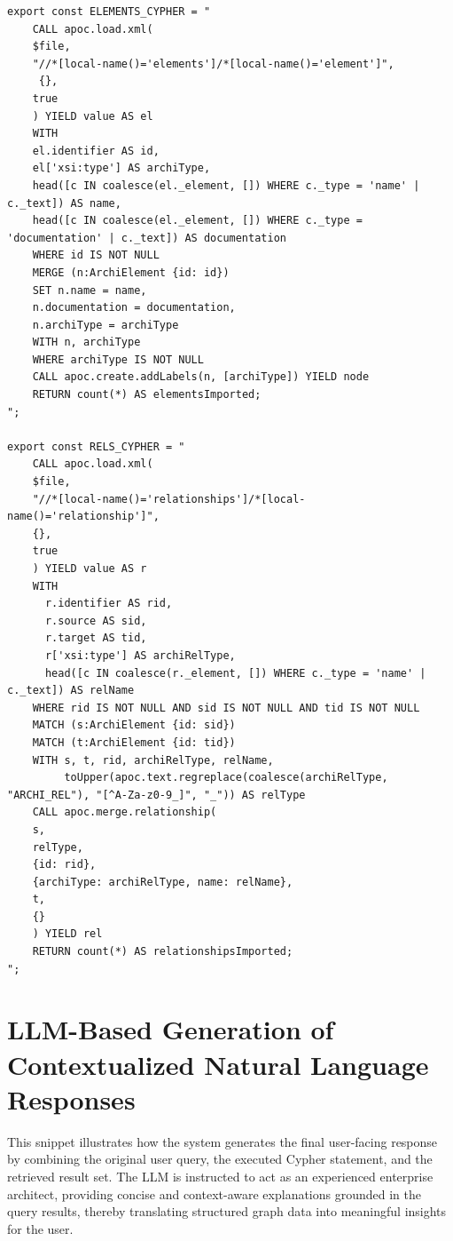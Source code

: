 \begin{lstlisting}[style=javascriptstyle, label={lst:system_prompt_1}]
export const ELEMENTS_CYPHER = "
	CALL apoc.load.xml(
	$file,
	"//*[local-name()='elements']/*[local-name()='element']",
	 {},
	true
	) YIELD value AS el
	WITH
	el.identifier AS id,
	el['xsi:type'] AS archiType,
	head([c IN coalesce(el._element, []) WHERE c._type = 'name' | c._text]) AS name,
	head([c IN coalesce(el._element, []) WHERE c._type = 'documentation' | c._text]) AS documentation
	WHERE id IS NOT NULL
	MERGE (n:ArchiElement {id: id})
	SET n.name = name,
    n.documentation = documentation,
    n.archiType = archiType
	WITH n, archiType
	WHERE archiType IS NOT NULL
	CALL apoc.create.addLabels(n, [archiType]) YIELD node
	RETURN count(*) AS elementsImported;
";

export const RELS_CYPHER = "
	CALL apoc.load.xml(
  	$file,
  	"//*[local-name()='relationships']/*[local-name()='relationship']",
  	{},
  	true
	) YIELD value AS r	
	WITH
	  r.identifier AS rid,
	  r.source AS sid,
	  r.target AS tid,
	  r['xsi:type'] AS archiRelType,
	  head([c IN coalesce(r._element, []) WHERE c._type = 'name' | c._text]) AS relName
	WHERE rid IS NOT NULL AND sid IS NOT NULL AND tid IS NOT NULL
	MATCH (s:ArchiElement {id: sid})
	MATCH (t:ArchiElement {id: tid})
	WITH s, t, rid, archiRelType, relName,
    	 toUpper(apoc.text.regreplace(coalesce(archiRelType, "ARCHI_REL"), "[^A-Za-z0-9_]", "_")) AS relType
	CALL apoc.merge.relationship(
  	s,
  	relType,
  	{id: rid},
  	{archiType: archiRelType, name: relName},
  	t,
 	{}
	) YIELD rel
	RETURN count(*) AS relationshipsImported;
";
\end{lstlisting}


\section{LLM-Based Generation of Contextualized Natural Language Responses}
\label{appendix:code:nlresponse}
This snippet illustrates how the system generates the final user-facing response by combining the original user query, the executed Cypher statement, and the retrieved result set. The LLM is instructed to act as an experienced enterprise architect, providing concise and context-aware explanations grounded in the query results, thereby translating structured graph data into meaningful insights for the user.

